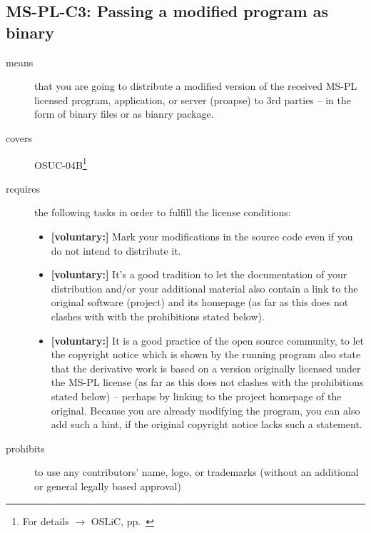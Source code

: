 \subsection{MS-PL-C3: Passing a modified program as binary}
\label{OSUC-04B-MS-PL}

\begin{description}

\item[means] that you are going to distribute a modified version of the received
MS-PL licensed program, application, or server (proapse) to 3rd parties -- in
the form of binary files or as bianry package.

\item[covers] OSUC-04B\footnote{For details $\rightarrow$ OSLiC, pp.\
\pageref{OSUC-04B-DEF}}

\item[requires] the following tasks in order to fulfill the license conditions:
\begin{itemize}
  
  \item \textbf{[voluntary:]} Mark your modifications in the source code even if
  you do not intend to distribute it.
  
  \item \textbf{[voluntary:]} It's a good tradition to let the documentation of
  your distribution and/or your additional material also contain a link to the
  original software (project) and its homepage (as far as this does not clashes
  with with the prohibitions stated below).
  
  \item \textbf{[voluntary:]} It is a good practice of the open source
  community, to let the copyright notice which is shown by the running program
  also state that the derivative work is based on a version originally licensed
  under the MS-PL license (as far as this does not clashes with the prohibitions
  stated below) -- perhaps by linking to the project homepage of the original.
  Because you are already modifying the program, you can also add such a hint,
  if the original copyright notice lacks such a statement.
    
\end{itemize}

\item[prohibits] to use any contributors' name, logo, or trademarks (without an
additional or general legally based approval)

\end{description}



